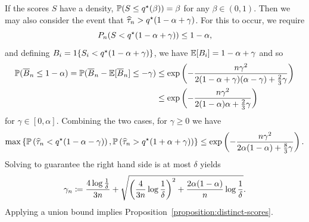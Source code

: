 \documentclass{article}
\newcommand{\scorefunc}{s}
\newcommand{\scoreval}{\scorefunc}
\newcommand{\scorerv}{S}
\begin{document}
If the scores $\scorerv$ have a density,
$\P(\scorerv \le q\opt(\beta)) = \beta$ for any $\beta \in (0, 1)$.
%
Then we may also consider the event that $\widehat{\tau}_n > q^\star(1 - \alpha +
\gamma)$.
%
For this to occur, we require
\begin{equation*}
  P_n(\scorerv < q\opt(1 - \alpha + \gamma)) \le 1 - \alpha,
\end{equation*}
and defining $B_i = \indic{\scorerv_i < q\opt(1 - \alpha + \gamma)}$,
we have $\mathbb{E}[B_i] = 1 - \alpha + \gamma$ and so
\begin{align*}
  \mathbb{P}(\overline{B}_n \le 1 - \alpha)
  = \mathbb{P}(\overline{B}_n - \mathbb{E}[\overline{B}_n] \le -\gamma)
  & \le \exp\left(-\frac{n \gamma^2}{2 (1 - \alpha + \gamma)
    (\alpha - \gamma) + \frac{2}{3} \gamma}\right) \\
  & \le \exp\left(-\frac{n \gamma^2}{2 (1 - \alpha)\alpha + \frac{2}{3}
    \gamma}\right)
\end{align*}
for $\gamma \in [0, \alpha]$.
%
Combining the two cases, for $\gamma \ge 0$ we have
\begin{equation*}
  \max\left\{\mathbb{P}\left(\widehat{\tau}_n < q^\star(1 - \alpha - \gamma)\right),
  \mathbb{P}\left(\widehat{\tau}_n > q^\star(1 + \alpha + \gamma)\right)\right\}
  \le \exp\left(-\frac{n \gamma^2}{2\alpha(1 - \alpha) + \frac{8}{3}
    \gamma}\right).
\end{equation*}
Solving to guarantee the right hand side is at most $\delta$ yields
\begin{equation*}
  \gamma_n \coloneqq \frac{4 \log \frac{1}{\delta}}{3n}
  + \sqrt{\left(\frac{4}{3 n} \log \frac{1}{\delta}\right)^2 +
    \frac{2 \alpha(1 - \alpha)}{n}
    \log \frac{1}{\delta}}.
\end{equation*}
Applying a union bound implies
Proposition~\ref{proposition:distinct-scores}.




\end{document}
